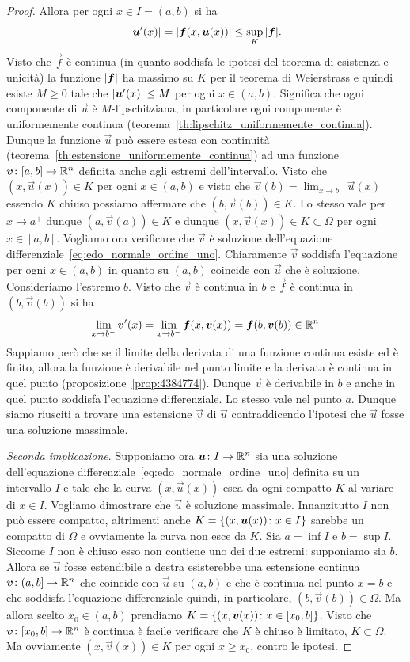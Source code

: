 \begin{proof}
Allora per ogni $x\in I=(a,b)$ si ha
\[
  {\left|\boldsymbol u'(x)\right|} = {\left|\boldsymbol f(x, \boldsymbol u(x))\right|}
   \le \sup_K {\left|\boldsymbol f\right|}.
\]
Visto che $\vec f$ è continua (in quanto soddisfa le ipotesi del teorema di esistenza e unicità) la funzione ${\left|\boldsymbol f\right|}$ ha massimo su $K$ per il teorema di Weierstrass e quindi esiste $M\ge 0$ tale che ${\left|\boldsymbol u'(x)\right|} \le M$ per ogni $x\in (a,b)$. Significa che ogni componente di $\vec u$ è $M$-lipschitziana, in particolare
ogni componente è uniformemente continua (teorema~\ref{th:lipschitz_uniformemente_continua}).
Dunque la funzione $\vec u$ può essere estesa con continuità
(teorema~\ref{th:estensione_uniformemente_continua})
ad una funzione $\boldsymbol v \colon [a,b] \to \mathbb R^n$ definita anche agli estremi dell'intervallo.
Visto che $(x,\vec u(x)) \in K$ per ogni $x\in(a,b)$ e visto che
$\vec v(b) = \lim_{x\to b^-}\vec u(x)$ essendo $K$ chiuso possiamo affermare che
$(b,\vec v(b)) \in K$.
Lo stesso vale per $x\to a^+$ dunque $(a,\vec v(a))\in K$
e dunque $(x,\vec v(x))\in K \subset \Omega$ per ogni $x\in [a,b]$.
Vogliamo ora verificare che $\vec v$ è soluzione dell'equazione differenziale~\eqref{eq:edo_normale_ordine_uno}.
Chiaramente $\vec v$ soddisfa l'equazione per ogni $x\in (a,b)$
in quanto su $(a,b)$ coincide con $\vec u$ che è soluzione.
Consideriamo l'estremo $b$.
Visto che $\vec v$ è continua in $b$ e $\vec f$ è continua in $(b,\vec v(b))$ si ha
\[
  \lim_{x\to b^-} \boldsymbol v'(x)
  = \lim_{x\to b^-} \boldsymbol f(x,\boldsymbol v(x))
  = \boldsymbol f(b,\boldsymbol v(b)) \in \mathbb R^n
\]
Sappiamo però che se il limite della derivata di una funzione continua esiste ed è finito, allora la funzione è derivabile nel punto limite e la derivata è continua in quel punto
(proposizione~\ref{prop:4384774}).
Dunque $\vec v$ è derivabile in $b$ e anche in quel punto soddisfa l'equazione differenziale. Lo stesso vale nel punto $a$. Dunque siamo riusciti a trovare una estensione $\vec v$ di $\vec u$ contraddicendo l'ipotesi che $\vec u$ fosse una soluzione massimale.

\emph{Seconda implicazione}. Supponiamo ora $\boldsymbol u\colon I\to \mathbb R^n$ sia una soluzione dell'equazione differenziale~\eqref{eq:edo_normale_ordine_uno} definita su un intervallo $I$ e tale che la curva $(x,\vec u(x))$ esca da ogni compatto $K$ al variare di $x\in I$. Vogliamo dimostrare che $\vec u$ è soluzione massimale. Innanzitutto $I$ non può essere compatto, altrimenti anche $K={\left\{ (x,\boldsymbol u(x))\colon x \in I \right\}}$ sarebbe un compatto di $\Omega$ e ovviamente la curva non esce da $K$.
Sia $a=\inf I$ e $b=\sup I$. Siccome $I$ non è chiuso esso non contiene uno dei due estremi: supponiamo sia $b$. Allora se $\vec u$ fosse estendibile a destra esisterebbe una estensione continua $\boldsymbol v\colon (a,b]\to \mathbb R^n$ che coincide con $\vec u$ su $(a,b)$ e che è continua nel punto $x=b$ e che soddisfa l'equazione differenziale quindi, in particolare, $(b,\vec v(b))\in \Omega$.
Ma allora scelto $x_0 \in (a,b)$
prendiamo $K={\left\{ (x,\boldsymbol v(x))\colon x\in [x_0,b] \right\}}$. Visto che $\boldsymbol v\colon[x_0,b]\to \mathbb R^n$ è continua è facile verificare che $K$ è chiuso è limitato, $K\subset \Omega$. Ma ovviamente $(x,\vec v(x))\in K$ per ogni $x\ge x_0$, contro le ipotesi.
\end{proof}


